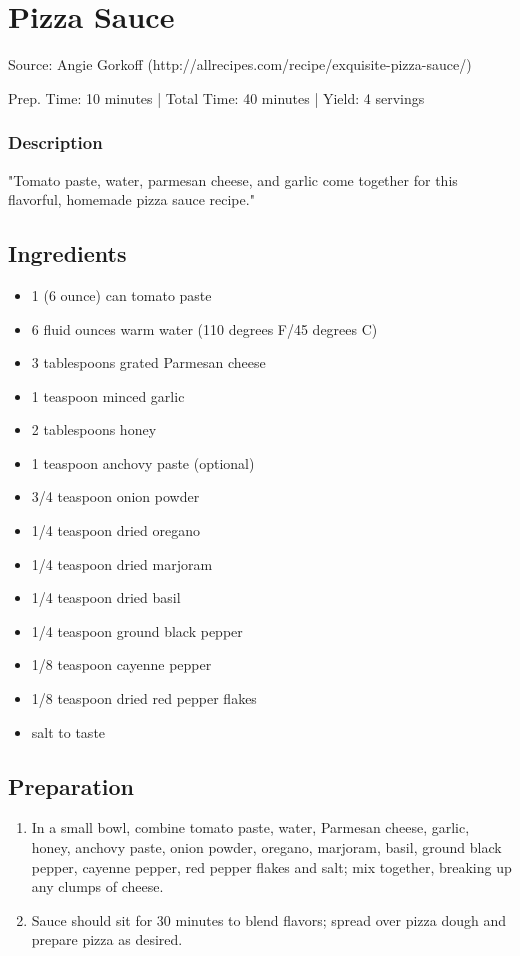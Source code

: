 \section{Pizza Sauce}

Source: Angie Gorkoff (http://allrecipes.com/recipe/exquisite-pizza-sauce/)

\begin{center}
Prep. Time: 10 minutes |
Total Time: 40 minutes | 
Yield: 4 servings
\end{center}

\subsubsection{Description}
"Tomato paste, water, parmesan cheese, and garlic come together for this flavorful, homemade pizza sauce recipe."

\subsection{Ingredients}
\begin{multicols}{2}
\begin{itemize}
    \item 1 (6 ounce) can tomato paste
    \item 6 fluid ounces warm water (110 degrees F/45 degrees C)
    \item 3 tablespoons grated Parmesan cheese
    \item 1 teaspoon minced garlic
    \item 2 tablespoons honey
    \item 1 teaspoon anchovy paste (optional)
    \item 3/4 teaspoon onion powder
    \item 1/4 teaspoon dried oregano
    \item 1/4 teaspoon dried marjoram
    \item 1/4 teaspoon dried basil
    \item 1/4 teaspoon ground black pepper
    \item 1/8 teaspoon cayenne pepper
    \item 1/8 teaspoon dried red pepper flakes
    \item salt to taste
\end{itemize}
\end{multicols}

\subsection{Preparation}
\begin{enumerate}
    \item In a small bowl, combine tomato paste, water, Parmesan cheese, garlic, honey, anchovy paste, onion powder, oregano, marjoram, basil, ground black pepper, cayenne pepper, red pepper flakes and salt; mix together, breaking up any clumps of cheese.
    \item Sauce should sit for 30 minutes to blend flavors; spread over pizza dough and prepare pizza as desired.
\end{enumerate}

